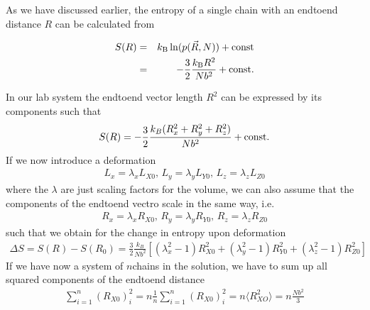 \documentclass[letterpaper,10pt,english]{sphinxmanual}
\begin{document}
\sphinxAtStartPar
As we have discussed earlier, the entropy of a single chain with an end\sphinxhyphen{}to\sphinxhyphen{}end distance \(R\) can be calculated from

\sphinxAtStartPar
\begin{eqnarray}
S(R)&=&k_\mathrm{B} \ln(p(\vec{R},N))+{\rm const}\\
&=&-\frac{3}{2}\frac{k_\mathrm{B} R^2}{Nb^2}+{\rm const}.
\end{eqnarray}

\sphinxAtStartPar
In our lab system the end\sphinxhyphen{}to\sphinxhyphen{}end vector length \(R^2\) can be expressed by its components such that
\begin{equation*}
\begin{split}S(R)=-\frac{3}{2}\frac{k_B (R_x^2+R_y^2+R_z^2)}{Nb^2}+{\rm const}.\end{split}
\end{equation*}
\sphinxAtStartPar
If we now introduce a deformation
\begin{equation*}
\begin{split}L_x=\lambda_x L_{X0},\, L_y=\lambda_y L_{Y0},\, L_z=\lambda_z L_{Z0}\end{split}
\end{equation*}
\sphinxAtStartPar
where the \(\lambda\) are just scaling factors for the volume, we can also assume that the components of the end\sphinxhyphen{}to\sphinxhyphen{}end vectro scale in the same way, i.e.
\begin{equation*}
\begin{split}R_x=\lambda_x R_{X0},\, R_y=\lambda_y R_{Y0},\, R_z=\lambda_z R_{Z0}\end{split}
\end{equation*}
\sphinxAtStartPar
such that we obtain for the change in entropy upon deformation
\begin{equation*}
\begin{split}\Delta S=S(R)-S(R_0)=\frac{3}{2}\frac{k_B}{Nb^2}\left [(\lambda_x^2-1)R_{X0}^2 +(\lambda_y^2-1)R_{Y0}^2+(\lambda_z^2-1)R_{Z0}^2\right ]\end{split}
\end{equation*}
\sphinxAtStartPar
If we have now a system of \(n\)\sphinxhyphen{}chains in the solution, we have to sum up all squared components of the end\sphinxhyphen{}to\sphinxhyphen{}end distance
\begin{equation*}
\begin{split}\sum_{i=1}^{n}(R_{X0})_i^2=n\frac{1}{n}\sum_{i=1}^{n}(R_{X0})_i^2=n\langle R_{XO}^2\rangle=n\frac{Nb^2}{3}\end{split}
\end{equation*}
\end{document}
